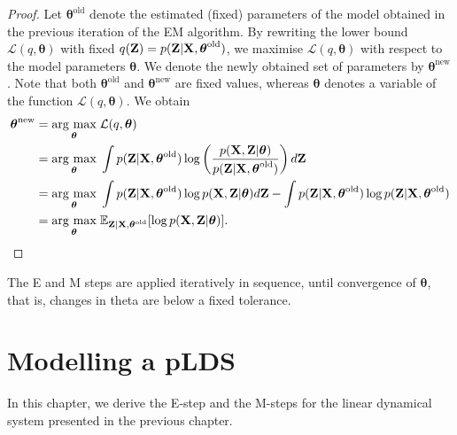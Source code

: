 \documentclass[12pt, oneside]{book}
\numberwithin{equation}{section}
\newcommand{\argmax}[1]{\underset{#1}{\operatorname{arg}\,\operatorname{max}}\;}
\newcommand{\X}{{\bf X}}
\newcommand{\Z}{{\bf Z}}
\begin{document}
{\begin{proof}
	Let $\boldsymbol{\theta}^\text{old}$ denote the estimated (fixed) parameters of the model obtained in the previous iteration of the EM algorithm. By rewriting the lower bound $\mathcal{L}(q, \boldsymbol{\theta})$ with fixed $q({\bf Z}) = p({\bf Z} \vert {\bf X}, \boldsymbol\theta^\text{old})$, we maximise $\mathcal{L}(q, \boldsymbol{\theta})$ with respect to the model parameters $\boldsymbol{\theta}$. We denote the newly obtained set of parameters by $\boldsymbol{\theta}^\text{new}$. Note that both $\boldsymbol{\theta}^\text{old}$ and $\boldsymbol{\theta}^\text{new}$ are fixed values, whereas $\boldsymbol{\theta}$ denotes a variable of the function $\mathcal{L}(q, \boldsymbol{\theta})$. We obtain
	\begin{align}
		\boldsymbol{\theta}^\text{new} &= \argmax{\boldsymbol\theta} \mathcal{L}(q, \boldsymbol\theta)\\
		&= \argmax{\boldsymbol{\theta}} \int p(\Z \vert \X, \boldsymbol{\theta}^\text{old}) \log\left(\frac{p(\X, \Z \vert \boldsymbol\theta)}{p(\Z \vert \X, \boldsymbol\theta^\text{old})}\right) d\Z\\
		&= \argmax{\boldsymbol{\theta}} \int p(\Z \vert \X, \boldsymbol{\theta} ^\text{old}) \log p(\X, \Z \vert \boldsymbol\theta) d\Z - \int p(\Z \vert \X, \boldsymbol{\theta}^\text{old}) \log p(\Z \vert \X, \boldsymbol{\theta}^\text{old})\\
		&= \argmax{\boldsymbol{\theta}} \mathbb{E}_{{\bf Z}\vert {\bf X}, \boldsymbol{\theta}^\text{old}}[\log p({\bf X}, {\bf Z}\vert \boldsymbol\theta)].
	\end{align}
\end{proof}
The E and M steps are applied iteratively in sequence, until convergence of $\boldsymbol{\theta}$, that is, changes in theta are below a fixed tolerance.

\chapter{Modelling a pLDS}
In this chapter, we derive the E-step and the M-steps for the linear dynamical system presented in the previous chapter.

}
\end{document}
